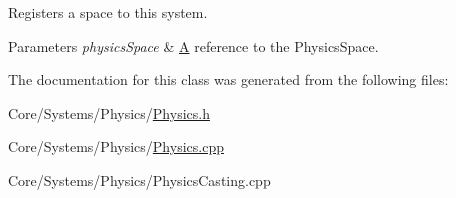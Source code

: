 Registers a space to this system. 


\begin{DoxyParams}{Parameters}
{\em physics\-Space} & \hyperlink{classA}{A} reference to the Physics\-Space. \\
\hline
\end{DoxyParams}


The documentation for this class was generated from the following files\-:\begin{DoxyCompactItemize}
\item 
Core/\-Systems/\-Physics/\hyperlink{Physics_8h}{Physics.\-h}\item 
Core/\-Systems/\-Physics/\hyperlink{Physics_8cpp}{Physics.\-cpp}\item 
Core/\-Systems/\-Physics/Physics\-Casting.\-cpp\end{DoxyCompactItemize}
